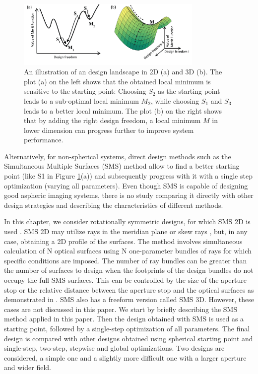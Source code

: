 \begin{figure}[h!]
    \centering
    \includegraphics[width=0.8\textwidth]{chapter-5/figures/Figure1_landscape.png}
    \caption{An illustration of an design landscape in 2D (a) and 3D (b). The plot (a) on the left shows that the obtained local minimum is sensitive to the starting point: Choosing $S_2$ as the starting point leads to a sub-optimal local minimum $M_2$, while choosing $S_1$ and $S_3$ leads to a better local minimum. The plot (b) on the right shows that by adding the right design freedom, a local minimum $M$ in lower dimension can progress further to improve system performance.}
    
    \label{fig: fig1_landscape}
\end{figure}
Alternatively, for non-spherical systems, direct design methods such as the Simultaneous Multiple Surfaces (SMS) method allow to find a better starting point (like S1 in Figure \ref{fig: fig1_landscape}(a)) \cite{WangThesis}\cite{LinWang12OE} and subsequently progress with it with a single step optimization (varying all parameters). Even though SMS is capable of designing good aspheric imaging systems, there is no study comparing it directly with other design strategies and describing the characteristics of different methods.

In this chapter, we consider rotationally symmetric designs, for which SMS 2D is used \cite{book:ChavesNonimagingOptics}. SMS 2D may utilize rays in the meridian plane or skew rays \cite{LinWang2011}, but, in any case, obtaining a 2D profile of the surfaces. The method involves simultaneous calculation of N optical surfaces using N one-parameter bundles of rays for which specific conditions are imposed. The number of ray bundles can be greater than the number of surfaces to design when the footprints of the design bundles do not occupy the full SMS surfaces. This can be controlled by the size of the aperture stop or the relative distance between the aperture stop and the optical surfaces as demonstrated in \cite{BenitezSPIE2014}\cite{FDuerrOE2013}\cite{FDuerrOE12}. SMS also has a freeform version called SMS 3D. However, these cases are not discussed in this paper. 
We start by briefly describing the SMS method applied in this paper. Then the design obtained with SMS is used as a starting point, followed by a single-step optimization of all parameters. The final design is compared with other designs obtained using spherical starting point and single-step, two-step, stepwise and global optimizations. Two designs are considered, a simple one and a slightly more difficult one with a larger aperture and wider field.
